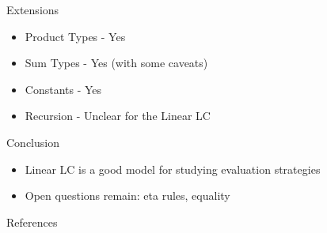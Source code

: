\documentclass[10pt]{beamer}
\begin{document}
\begin{frame}{Extensions}
  \begin{itemize}
    \item Product Types - Yes
    \item Sum Types - Yes (with some caveats)
    \item Constants - Yes
    \item Recursion - Unclear for the Linear LC
  \end{itemize}
\end{frame}

\begin{frame}{Conclusion}
  \begin{itemize}
    \item Linear LC is a good model for studying evaluation strategies
    \item Open questions remain: eta rules, equality
  \end{itemize}
\end{frame}


\begin{frame}[allowframebreaks]{References}
  
  
\end{frame}
\end{document}
